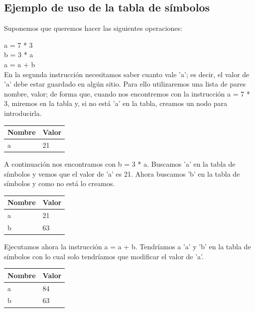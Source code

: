 \documentclass[11pt, english]{article}
\begin{document}
	\subsection{Ejemplo de uso de la tabla de símbolos}
	
	Suponemos que queremos hacer las siguientes operaciones:
	
		a = 7 * 3 \\
		b = 3 * a \\
		a = a + b \\
	
	En la segunda instrucción necesitamos saber cuanto vale 'a'; es decir, el valor de 'a' debe estar guardado en algún sitio. Para ello utilizaremos una lista de pares nombre, valor; de forma que, cuando nos encontremos con la instrucción a = 7 * 3, miremos en la tabla y, si no está 'a' en la tabla, creamos un nodo para introducirla.
	\newline
	\begin{table}[H]
		\begin{center}
			\begin{tabular}{l|l}
				\toprule
				\textbf{Nombre} & \textbf{Valor}\\
				\midrule
				a	& 	21\\
				\bottomrule
			\end{tabular}
		\end{center}
	\end{table}
	A continuación nos encontramos con b = 3 * a. Buscamos 'a' en la tabla de símbolos y vemos que el valor de 'a' es 21. Ahora buscamos 'b' en la tabla de símbolos y como no está lo creamos.
	\newline
	\begin{table}[H]
		\begin{center}
			\begin{tabular}{l|l}
				\toprule
				\textbf{Nombre} & \textbf{Valor}\\
				\midrule
				a	& 	21\\
				b	&	63\\
				\bottomrule
			\end{tabular}
		\end{center}
	\end{table}
	Ejecutamos ahora la instrucción a = a + b. Tendríamos a 'a' y 'b' en la tabla de símbolos con lo cual solo tendríamos que modificar	el valor de 'a'.
	\newline
	\begin{table}[H]
		\begin{center}
			\begin{tabular}{l|l}
				\toprule
				\textbf{Nombre} & \textbf{Valor}\\
				\midrule
				a	& 	84\\
				b	&	63\\
				\bottomrule
			\end{tabular}
		\end{center}
	\end{table}
	
\end{document}
